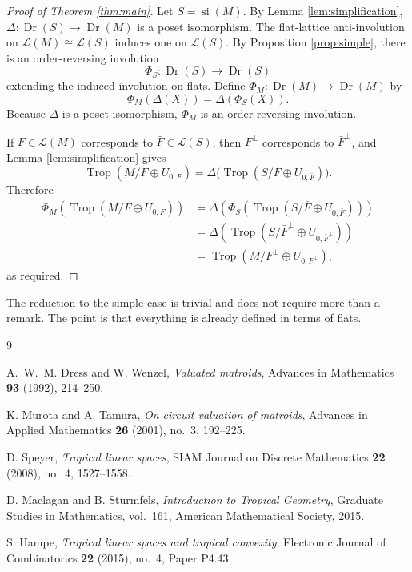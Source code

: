 \documentclass[12pt]{article}
\theoremstyle{definition}
\newcommand{\Trop}{\operatorname{Trop}}
\newcommand{\Dr}{\operatorname{Dr}}
\newcommand{\cL}{\mathcal L}
\newcommand{\review}[1]{\begin{reviewbox}#1\end{reviewbox}}
\begin{document}
\begin{proof}[Proof of Theorem \ref{thm:main}]
Let \(S=\operatorname{si}(M)\).  By Lemma \ref{lem:simplification}, \(\Delta:\Dr(S)\to\Dr(M)\) is a poset isomorphism.  The flat-lattice anti-involution on \(\cL(M)\cong\cL(S)\) induces one on \(\cL(S)\).  By Proposition \ref{prop:simple}, there is an order-reversing involution
\[
\Phi_S:\Dr(S)\to\Dr(S)
\]
extending the induced involution on flats.  Define \(\Phi_M:\Dr(M)\to\Dr(M)\) by
\[
\Phi_M(\Delta(X))=\Delta(\Phi_S(X)).
\]
Because \(\Delta\) is a poset isomorphism, \(\Phi_M\) is an order-reversing involution.

If \(F\in\cL(M)\) corresponds to \(\bar F\in\cL(S)\), then \(F^\perp\) corresponds to \(\bar F^\perp\), and Lemma \ref{lem:simplification} gives
\[
\Trop(M/F\oplus U_{0,F})
=
\Delta\bigl(\Trop(S/\bar F\oplus U_{0,\bar F})\bigr).
\]
Therefore
\[
\begin{aligned}
\Phi_M\!\left(\Trop(M/F\oplus U_{0,F})\right)
&=
\Delta\!\left(\Phi_S\!\left(\Trop(S/\bar F\oplus U_{0,\bar F})\right)\right)\\
&=
\Delta\!\left(\Trop(S/\bar F^\perp\oplus U_{0,\bar F^\perp})\right)\\
&=
\Trop(M/F^\perp\oplus U_{0,F^\perp}),
\end{aligned}
\]
as required.
\end{proof}
\review{The reduction to the simple case is trivial and does not require more than a remark. The point is that everything is already defined in terms of flats.}

\begin{thebibliography}{9}

A.~W.~M. Dress and W. Wenzel,
\emph{Valuated matroids},
Advances in Mathematics \textbf{93} (1992), 214--250.

K. Murota and A. Tamura,
\emph{On circuit valuation of matroids},
Advances in Applied Mathematics \textbf{26} (2001), no.~3, 192--225.

D. Speyer,
\emph{Tropical linear spaces},
SIAM Journal on Discrete Mathematics \textbf{22} (2008), no.~4, 1527--1558.

D. Maclagan and B. Sturmfels,
\emph{Introduction to Tropical Geometry},
Graduate Studies in Mathematics, vol.~161, American Mathematical Society, 2015.

S. Hampe,
\emph{Tropical linear spaces and tropical convexity},
Electronic Journal of Combinatorics \textbf{22} (2015), no.~4, Paper P4.43.

\end{thebibliography}
\end{document}
